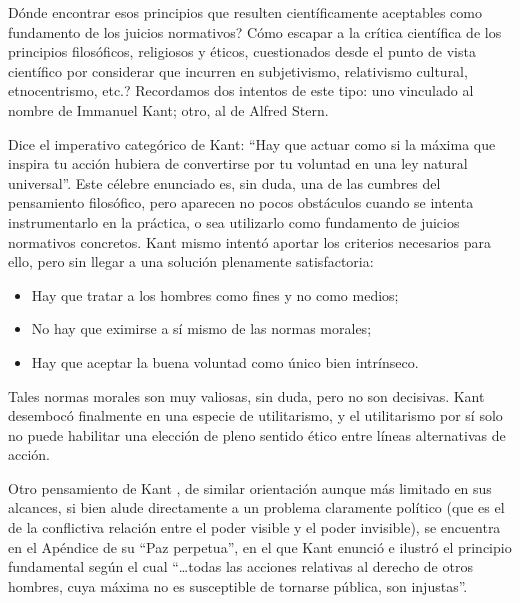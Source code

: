 \documentclass[
]{book}
\providecommand{\tightlist}{%
  \setlength{\itemsep}{0pt}\setlength{\parskip}{0pt}}
\begin{document}
Dónde encontrar esos principios que resulten científicamente aceptables como fundamento de los juicios normativos? Cómo escapar a la crítica científica de los principios filosóficos, religiosos y éticos, cuestionados desde el punto de vista científico por considerar que incurren en subjetivismo, relativismo cultural, etnocentrismo, etc.? Recordamos dos intentos de este tipo: uno vinculado al nombre de Immanuel Kant; otro, al de Alfred Stern.

Dice el imperativo categórico de Kant: ``Hay que actuar como si la máxima que inspira tu acción hubiera de convertirse por tu voluntad en una ley natural universal''. Este célebre enunciado es, sin duda, una de las cumbres del pensamiento filosófico, pero aparecen no pocos obstáculos cuando se intenta instrumentarlo en la práctica, o sea utilizarlo como fundamento de juicios normativos concretos. Kant mismo intentó aportar los criterios necesarios para ello, pero sin llegar a una solución plenamente satisfactoria:

\begin{itemize}
\tightlist
\item
  Hay que tratar a los hombres como fines y no como medios;
\item
  No hay que eximirse a sí mismo de las normas morales;
\item
  Hay que aceptar la buena voluntad como único bien intrínseco.
\end{itemize}

Tales normas morales son muy valiosas, sin duda, pero no son decisivas. Kant desembocó finalmente en una especie de utilitarismo, y el utilitarismo por sí solo no puede habilitar una elección de pleno sentido ético entre líneas alternativas de acción.

Otro pensamiento de Kant , de similar orientación aunque más limitado en sus alcances, si bien alude directamente a un problema claramente político (que es el de la conflictiva relación entre el poder visible y el poder invisible), se encuentra en el Apéndice de su ``Paz perpetua'', en el que Kant enunció e ilustró el principio fundamental según el cual ``\ldots todas las acciones relativas al derecho de otros hombres, cuya máxima no es susceptible de tornarse pública, son injustas''.
\end{document}
